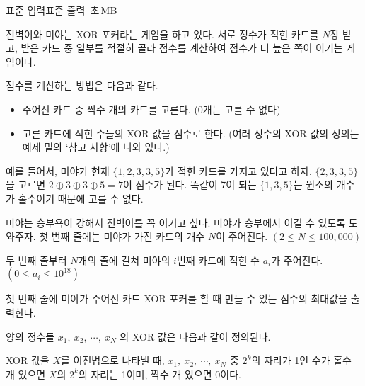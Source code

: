 \begin{problem}{\kcpcxorpokertitle}
    {표준 입력}{표준 출력}
    {\kcpcxorpokertime\,초}{\kcpcxorpokermemory\,MB}{}{\kcpcxorpokerscore}
    
    진벽이와 미야는 XOR 포커라는 게임을 하고 있다. 서로 정수가 적힌 카드를 $ N $장 받고, 받은 카드 중 일부를 적절히 골라 점수를 계산하여 점수가 더 높은 쪽이 이기는 게임이다.
    
    점수를 계산하는 방법은 다음과 같다.
    
    \begin{itemize}
        \item 주어진 카드 중 짝수 개의 카드를 고른다. (0개는 고를 수 없다)
        \item 고른 카드에 적힌 수들의 XOR 값을 점수로 한다. (여러 정수의 XOR 값의 정의는 예제 밑의 `참고 사항'에 나와 있다.)%
    \end{itemize}
        
    예를 들어서, 미야가 현재 $ \{1, 2, 3, 3, 5\} $가 적힌 카드를 가지고 있다고 하자. $ \{2, 3, 3, 5\} $을 고르면 $ 2 \oplus 3 \oplus 3 \oplus 5 = 7$이 점수가 된다. 똑같이 7이 되는 $ \{1, 3, 5\} $는 원소의 개수가 홀수이기 때문에 고를 수 없다.
    
    미야는 승부욕이 강해서 진벽이를 꼭 이기고 싶다. 미야가 승부에서 이길 수 있도록 도와주자.
    \InputFile
    첫 번째 줄에는 미야가 가진 카드의 개수 $ N $이 주어진다. $ (2 \leq N \leq 100,000) $
    
    두 번째 줄부터 $ N $개의 줄에 걸쳐 미야의 $ i $번째 카드에 적힌 수 $ a_i $가 주어진다. $ (0 \leq a_i \leq 10^{18}) $
    
    
    \OutputFile
    첫 번째 줄에 미야가 주어진 카드 XOR 포커를 할 때 만들 수 있는 점수의 최대값을 출력한다.

    \Examples
    
    \begin{example}
    \end{example}
    
    \Note
    양의 정수들 $ x_1,\ x_2,\ \cdots,\ x_N $ 의 XOR 값은 다음과 같이 정의된다.
    
    XOR 값을 $X$를 이진법으로 나타낼 때, $ x_1,\ x_2,\ \cdots,\ x_N $ 중 $ 2^k $의 자리가 1인 수가 홀수 개 있으면 $ X $의 $ 2^k $의 자리는 1이며, 짝수 개 있으면 0이다.
\end{problem}

